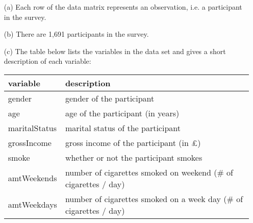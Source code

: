 {
\begin{enumerate}
\item[(a)] Each row of the data matrix represents an observation, i.e. a participant in the survey.
\item[(b)] There are 1,691 participants in the survey.
\item[(c)] The table below lists the variables in the data set and gives a short description of each variable:
\begin{center}
\begin{tabular}{l l}
  \hline
\textbf{variable} & \textbf{description} \\ 
\hline
gender & gender of the participant \\ 	
age & age of the participant (in years) \\
maritalStatus & marital status of the participant \\
grossIncome & gross income of the participant (in $\pounds$) \\
smoke & whether or not the participant smokes \\
amtWeekends & number of cigarettes smoked on weekend (\# of cigarettes / day) \\ 
amtWeekdays & number of cigarettes smoked on a week day (\# of cigarettes / day) \\
  \hline
\end{tabular}
\end{center}
\end{enumerate}
}\label{UKSmoking_datamatrix}

%

